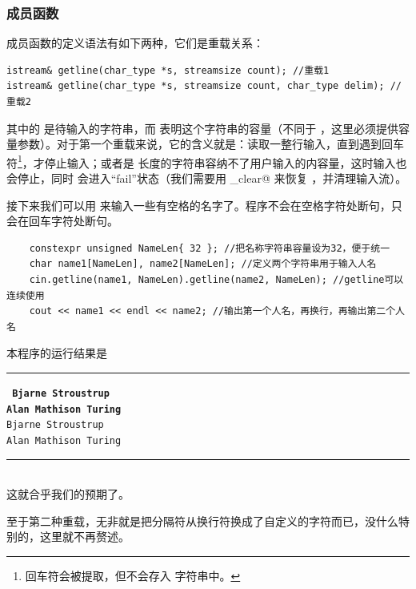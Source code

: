 \subsubsection*{\lstinline@getline@ 成员函数}
\lstinline@getline@ 成员函数的定义语法有如下两种，它们是重载关系：
\begin{lstlisting}
istream& getline(char_type *s, streamsize count); //重载1
istream& getline(char_type *s, streamsize count, char_type delim); //重载2
\end{lstlisting}
其中的 \lstinline@s@ 是待输入的字符串，而 \lstinline@count@ 表明这个字符串的容量（不同于 \lstinline@strcpy@，这里必须提供容量参数）。对于第一个重载来说，它的含义就是：读取一整行输入，直到遇到回车符\footnote{回车符会被提取，但不会存入 \lstinline@s@ 字符串中。}，才停止输入；或者是 \lstinline@count@ 长度的字符串容纳不了用户输入的内容量，这时输入也会停止，同时 \lstinline@cin@ 会进入``fail''状态（我们需要用 \lstinline@input_clear@ 来恢复 \lstinline@cin@，并清理输入流）。\par
接下来我们可以用 \lstinline@getline@ 来输入一些有空格的名字了。程序不会在空格字符处断句，只会在回车字符处断句。\par
\begin{lstlisting}
    constexpr unsigned NameLen{ 32 }; //把名称字符串容量设为32，便于统一
    char name1[NameLen], name2[NameLen]; //定义两个字符串用于输入人名
    cin.getline(name1, NameLen).getline(name2, NameLen); //getline可以连续使用
    cout << name1 << endl << name2; //输出第一个人名，再换行，再输出第二个人名
\end{lstlisting}
本程序的运行结果是\\\noindent\rule{\linewidth}{.2pt}\texttt{
\textbf{Bjarne Stroustrup\\
Alan Mathison Turing}\\
Bjarne Stroustrup\\
Alan Mathison Turing
}\\\noindent\rule{\linewidth}{.2pt}\\
这就合乎我们的预期了。\par
至于第二种重载，无非就是把分隔符从换行符换成了自定义的字符而已，没什么特别的，这里就不再赘述。\par
